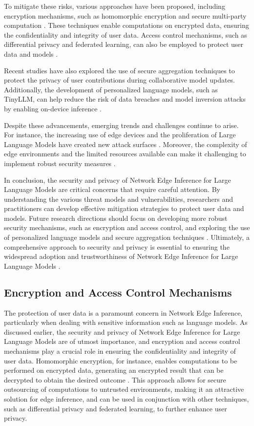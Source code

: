 \documentclass[11pt,a4paper]{article}
\begin{document}
To mitigate these risks, various approaches have been proposed, including encryption mechanisms, such as homomorphic encryption and secure multi-party computation \cite{doi:10.1109/sp61157.2025.00182}. These techniques enable computations on encrypted data, ensuring the confidentiality and integrity of user data. Access control mechanisms, such as differential privacy and federated learning, can also be employed to protect user data and models \cite{doi:10.1609/aaai.v37i9.26255}.

Recent studies have also explored the use of secure aggregation techniques to protect the privacy of user contributions during collaborative model updates. Additionally, the development of personalized language models, such as TinyLLM, can help reduce the risk of data breaches and model inversion attacks by enabling on-device inference \cite{arxiv:2412.15304}.

Despite these advancements, emerging trends and challenges continue to arise. For instance, the increasing use of edge devices and the proliferation of Large Language Models have created new attack surfaces \cite{doi:10.1109/mnet.2025.3539338}. Moreover, the complexity of edge environments and the limited resources available can make it challenging to implement robust security measures \cite{arxiv:2405.14371}.

In conclusion, the security and privacy of Network Edge Inference for Large Language Models are critical concerns that require careful attention. By understanding the various threat models and vulnerabilities, researchers and practitioners can develop effective mitigation strategies to protect user data and models. Future research directions should focus on developing more robust security mechanisms, such as encryption and access control, and exploring the use of personalized language models and secure aggregation techniques \cite{doi:10.1145/3788870}. Ultimately, a comprehensive approach to security and privacy is essential to ensuring the widespread adoption and trustworthiness of Network Edge Inference for Large Language Models \cite{arxiv:2601.11652}.


\subsection{Encryption and Access Control Mechanisms}


The protection of user data is a paramount concern in Network Edge Inference, particularly when dealing with sensitive information such as language models. As discussed earlier, the security and privacy of Network Edge Inference for Large Language Models are of utmost importance, and encryption and access control mechanisms play a crucial role in ensuring the confidentiality and integrity of user data. Homomorphic encryption, for instance, enables computations to be performed on encrypted data, generating an encrypted result that can be decrypted to obtain the desired outcome \cite{doi:10.1109/hpec58863.2023.10363447}. This approach allows for secure outsourcing of computations to untrusted environments, making it an attractive solution for edge inference, and can be used in conjunction with other techniques, such as differential privacy and federated learning, to further enhance user privacy.
\end{document}
